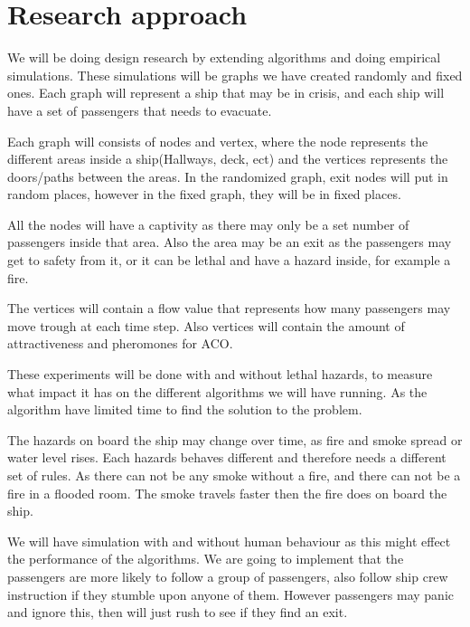 \chapter{Research approach}
\label{ch:approach}




We will be doing design research by extending algorithms and doing empirical simulations. These simulations will be graphs we have created randomly and fixed ones. Each graph will represent a ship that may be in crisis, and each ship will have a set of passengers that needs to evacuate.



Each graph will consists of nodes and vertex, where the node represents the different areas inside a ship(Hallways, deck, ect) and the vertices represents the doors/paths between the areas. In the randomized graph, exit nodes will put in random places, however in the fixed graph, they will be in fixed places. 

All the nodes will have a captivity as there may only be a set number of passengers inside that area. Also the area may be an exit as the passengers may get to safety from it, or it can be lethal and have a hazard inside, for example a fire.

The vertices will contain a flow value that represents how many passengers may move trough at each time step. Also vertices will contain the amount of attractiveness and pheromones for ACO.

These experiments will be done with and without lethal hazards, to measure what impact it has on the different algorithms we will have running. As the algorithm have limited time to find the solution to the problem.

The hazards on board the ship may change over time, as fire and smoke spread or water level rises. Each hazards behaves different and therefore needs a different set of rules. As there can not be any smoke without a fire, and there can not be a fire in a flooded room. The smoke travels faster then the fire does on board the ship.

We will have simulation with and without human behaviour as this might effect the performance of the algorithms. We are going to implement that the passengers are more likely to follow a group of passengers, also follow ship crew instruction if they stumble upon anyone of them. However passengers may panic and ignore this, then will just rush to see if they find an exit.


